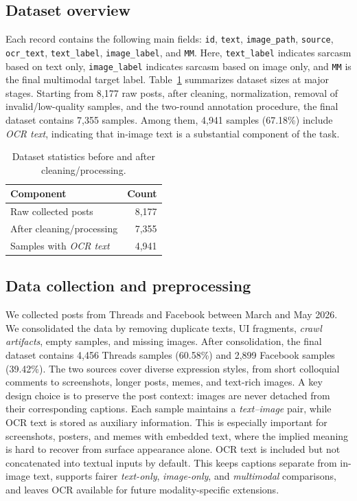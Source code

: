 \documentclass[conference]{IEEEtran}
\begin{document}
\subsection{Dataset overview}
Each record contains the following main fields: \texttt{id}, \texttt{text}, \texttt{image\_path}, \texttt{source}, \texttt{ocr\_text}, \texttt{text\_label}, \texttt{image\_label}, and \texttt{MM}. Here, \texttt{text\_label} indicates sarcasm based on text only, \texttt{image\_label} indicates sarcasm based on image only, and \texttt{MM} is the final multimodal target label.
Table~\ref{tab:dataset-summary} summarizes dataset sizes at major stages. Starting from 8{,}177 raw posts, after cleaning, normalization, removal of invalid/low-quality samples, and the two-round annotation procedure, the final dataset contains 7{,}355 samples. Among them, 4{,}941 samples (67.18\%) include \textit{OCR text}, indicating that in-image text is a substantial component of the task.
\begin{table}[t]
\centering
\footnotesize
\begin{tabular}{lr}
\toprule
\textbf{Component} & \textbf{Count} \\
\midrule
Raw collected posts & 8{,}177 \\
After cleaning/processing  & 7{,}355 \\
Samples with \textit{OCR text} & 4{,}941 \\
\bottomrule
\end{tabular}
\caption{Dataset statistics before and after cleaning/processing.}
\label{tab:dataset-summary}
\end{table}
\subsection{Data collection and preprocessing}
We collected posts from Threads and Facebook between March and May 2026. We consolidated the data by removing duplicate texts, UI fragments, \textit{crawl artifacts}, empty samples, and missing images.
After consolidation, the final dataset contains 4{,}456 Threads samples (60.58\%) and 2{,}899 Facebook samples (39.42\%). The two sources cover diverse expression styles, from short colloquial comments to screenshots, longer posts, memes, and text-rich images.
A key design choice is to preserve the post context: images are never detached from their corresponding captions. Each sample maintains a \textit{text--image} pair, while OCR text is stored as auxiliary information. This is especially important for screenshots, posters, and memes with embedded text, where the implied meaning is hard to recover from surface appearance alone.
OCR text is included but not concatenated into textual inputs by default. This keeps captions separate from in-image text, supports fairer \textit{text-only}, \textit{image-only}, and \textit{multimodal} comparisons, and leaves OCR available for future modality-specific extensions.
\end{document}
